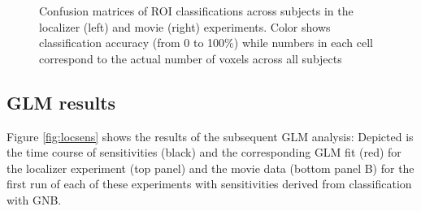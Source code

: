 \documentclass[a4paper, 12pt]{scrreprt}
\begin{document}
\begin{figure}[H]

	\caption[Classification results in two proof-of-concept analyses]{\small{Confusion matrices of ROI classifications across subjects in the localizer (left) and movie (right) experiments. Color shows classification accuracy (from 0 to 100$\%$) while numbers in each cell correspond to the actual number of voxels across all subjects }}
	\label{fig:CV}
\end{figure}




\subsection{GLM results}\label{sec:c1_glm_res}

Figure \ref{fig:locsens} shows the results of the subsequent GLM analysis: Depicted is the time course of sensitivities (black) and the corresponding GLM fit (red) for the localizer experiment (top panel) and the movie data (bottom panel B) for the first run of each of these experiments with sensitivities derived from classification with GNB.
\end{document}
